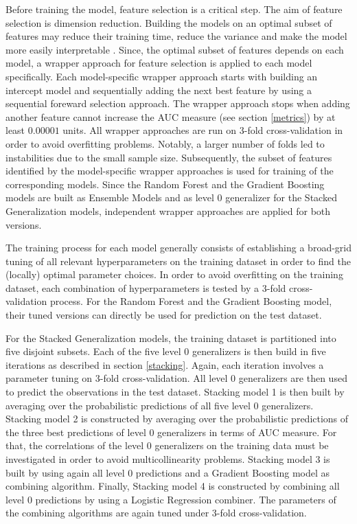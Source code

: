 \documentclass[12pt]{article}
\begin{document}
Before training the model, feature selection is a critical step. The aim of feature selection is dimension reduction. Building the models on an optimal subset of features may reduce their training time, reduce the variance and make the model more easily interpretable \citep{guyon2003introduction}. Since, the optimal subset of features depends on each model, a wrapper approach for feature selection is applied to each model specifically. Each model-specific wrapper approach starts with building an intercept model and sequentially adding the next best feature by using a sequential foreward selection approach. The wrapper approach stops when adding another feature cannot increase the AUC measure (see section \ref{metrics}) by at least $0.00001$ units. All wrapper approaches are run on 3-fold cross-validation in order to avoid overfitting problems. Notably, a larger number of folds led to instabilities due to the small sample size. Subsequently, the subset of features identified by the model-specific wrapper approaches is used for training of the corresponding models. Since the Random Forest and the Gradient Boosting models are built as Ensemble Models and as level 0 generalizer for the Stacked Generalization models, independent wrapper approaches are applied for both versions.

The training process for each model generally consists of establishing a broad-grid tuning of all relevant hyperparameters on the training dataset in order to find the (locally) optimal parameter choices. In order to avoid overfitting on the training dataset, each combination of hyperparameters is tested by a 3-fold cross-validation process. For the Random Forest and the Gradient Boosting model, their tuned versions can directly be used for prediction on the test dataset.

For the Stacked Generalization models, the training dataset is partitioned into five disjoint subsets. Each of the five level 0 generalizers is then build in five iterations as described in section \ref{stacking}. Again, each iteration involves a parameter tuning on 3-fold cross-validation. All level 0 generalizers are then used to predict the observations in the test dataset. Stacking model 1 is then built by averaging over the probabilistic predictions of all five level 0 generalizers. Stacking model 2 is constructed by averaging over the probabilistic predictions of the three best predictions of level 0 generalizers in terms of AUC measure. For that, the correlations of the level 0 generalizers on the training data must be investigated in order to avoid multicollinearity problems. Stacking model 3 is built by using again all level 0 predictions and a Gradient Boosting model as combining algorithm. Finally, Stacking model 4 is constructed by combining all level 0 predictions by using a Logistic Regression combiner. The parameters of the combining algorithms are again tuned under 3-fold cross-validation.
\end{document}
